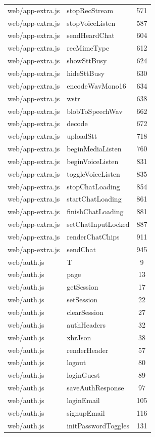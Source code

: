 \begin{center}
\begin{longtable}{@{}p{4.6cm}p{5.2cm}c@{}}
web/app-extra.js & stopRecStream & 571 \\
web/app-extra.js & stopVoiceListen & 587 \\
web/app-extra.js & sendHeardChat & 604 \\
web/app-extra.js & recMimeType & 612 \\
web/app-extra.js & showSttBusy & 624 \\
web/app-extra.js & hideSttBusy & 630 \\
web/app-extra.js & encodeWavMono16 & 634 \\
web/app-extra.js & wstr & 638 \\
web/app-extra.js & blobToSpeechWav & 662 \\
web/app-extra.js & decode & 672 \\
web/app-extra.js & uploadStt & 718 \\
web/app-extra.js & beginMediaListen & 760 \\
web/app-extra.js & beginVoiceListen & 831 \\
web/app-extra.js & toggleVoiceListen & 835 \\
web/app-extra.js & stopChatLoading & 854 \\
web/app-extra.js & startChatLoading & 861 \\
web/app-extra.js & finishChatLoading & 881 \\
web/app-extra.js & setChatInputLocked & 887 \\
web/app-extra.js & renderChatChips & 911 \\
web/app-extra.js & sendChat & 945 \\
web/auth.js & T & 9 \\
web/auth.js & page & 13 \\
web/auth.js & getSession & 17 \\
web/auth.js & setSession & 22 \\
web/auth.js & clearSession & 27 \\
web/auth.js & authHeaders & 32 \\
web/auth.js & xhrJson & 38 \\
web/auth.js & renderHeader & 57 \\
web/auth.js & logout & 80 \\
web/auth.js & loginGuest & 89 \\
web/auth.js & saveAuthResponse & 97 \\
web/auth.js & loginEmail & 105 \\
web/auth.js & signupEmail & 116 \\
web/auth.js & initPasswordToggles & 131 \\

\end{longtable}
\end{center}
